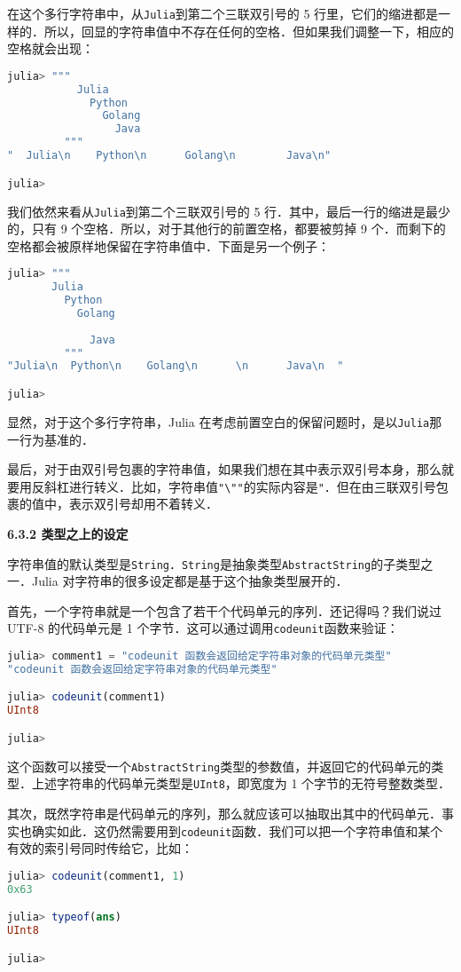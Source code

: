 在这个多行字符串中，从\verb|Julia|到第二个三联双引号的 5 行里，它们的缩进都是一样的．所以，回显的字符串值中不存在任何的空格．但如果我们调整一下，相应的空格就会出现：
\begin{lstlisting}[language=julia]
julia> """
           Julia
             Python
               Golang
                 Java
         """
"  Julia\n    Python\n      Golang\n        Java\n"

julia> 
\end{lstlisting}

我们依然来看从\verb|Julia|到第二个三联双引号的 5 行．其中，最后一行的缩进是最少的，只有 9 个空格．所以，对于其他行的前置空格，都要被剪掉 9 个．而剩下的空格都会被原样地保留在字符串值中．下面是另一个例子：
\begin{lstlisting}[language=julia]
julia> """
       Julia
         Python
           Golang
             
             Java
         """
"Julia\n  Python\n    Golang\n      \n      Java\n  "

julia> 
\end{lstlisting}

显然，对于这个多行字符串，Julia 在考虑前置空白的保留问题时，是以\verb|Julia|那一行为基准的．

最后，对于由双引号包裹的字符串值，如果我们想在其中表示双引号本身，那么就要用反斜杠进行转义．比如，字符串值\verb|"\""|的实际内容是\verb|"|．但在由三联双引号包裹的值中，表示双引号却用不着转义．

\textbf{6.3.2 类型之上的设定}

字符串值的默认类型是\verb|String|．\verb|String|是抽象类型\verb|AbstractString|的子类型之一．Julia 对字符串的很多设定都是基于这个抽象类型展开的．

首先，一个字符串就是一个包含了若干个代码单元的序列．还记得吗？我们说过 UTF-8 的代码单元是 1 个字节．这可以通过调用\verb|codeunit|函数来验证：
\begin{lstlisting}[language=julia]
julia> comment1 = "codeunit 函数会返回给定字符串对象的代码单元类型"
"codeunit 函数会返回给定字符串对象的代码单元类型"

julia> codeunit(comment1)
UInt8

julia> 
\end{lstlisting}

这个函数可以接受一个\verb|AbstractString|类型的参数值，并返回它的代码单元的类型．上述字符串的代码单元类型是\verb|UInt8|，即宽度为 1 个字节的无符号整数类型．

其次，既然字符串是代码单元的序列，那么就应该可以抽取出其中的代码单元．事实也确实如此．这仍然需要用到\verb|codeunit|函数．我们可以把一个字符串值和某个有效的索引号同时传给它，比如：
\begin{lstlisting}[language=julia]
julia> codeunit(comment1, 1)
0x63

julia> typeof(ans)
UInt8

julia> 
\end{lstlisting}

